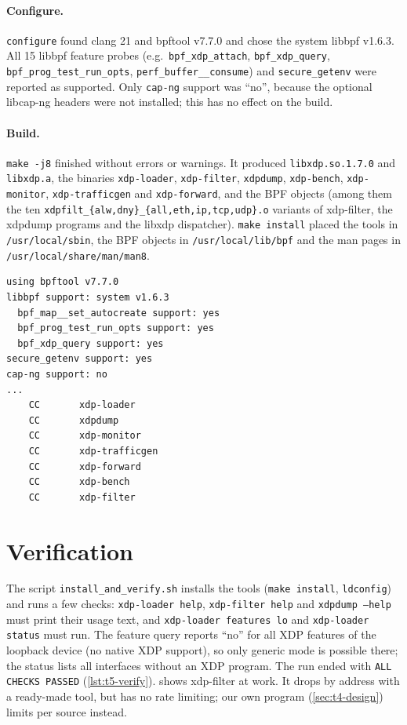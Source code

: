 \paragraph{Configure.} \texttt{configure} found clang 21 and bpftool v7.7.0 and chose the system libbpf v1.6.3. All 15 libbpf feature probes (e.g.\ \texttt{bpf\_xdp\_attach}, \texttt{bpf\_xdp\_query}, \texttt{bpf\_prog\_test\_run\_opts}, \texttt{perf\_buffer\_\_consume}) and \texttt{secure\_getenv} were reported as supported. Only \texttt{cap-ng} support was \enquote{no}, because the optional libcap-ng headers were not installed; this has no effect on the build.

\paragraph{Build.} \texttt{make -j8} finished without errors or warnings. It produced \texttt{libxdp.so.1.7.0} and \texttt{libxdp.a}, the binaries \texttt{xdp-loader}, \texttt{xdp-filter}, \texttt{xdpdump}, \texttt{xdp-bench}, \texttt{xdp-monitor}, \texttt{xdp-trafficgen} and \texttt{xdp-forward}, and the BPF objects (among them the ten \texttt{xdpfilt\_\{alw,dny\}\_\{all,eth,ip,tcp,udp\}.o} variants of xdp-filter, the xdpdump programs and the libxdp dispatcher). \texttt{make install} placed the tools in \texttt{/usr/local/sbin}, the BPF objects in \texttt{/usr/local/lib/bpf} and the man pages in \texttt{/usr/local/share/man/man8}.

\begin{lstlisting}[style=bashsh,float=htbp,caption={Abridged excerpt of \texttt{configure.log} (libbpf and feature probes) and the end of \texttt{make.log} (produced binaries).},label=lst:t5-log]
using bpftool v7.7.0
libbpf support: system v1.6.3
  bpf_map__set_autocreate support: yes
  bpf_prog_test_run_opts support: yes
  bpf_xdp_query support: yes
secure_getenv support: yes
cap-ng support: no
...
    CC       xdp-loader
    CC       xdpdump
    CC       xdp-monitor
    CC       xdp-trafficgen
    CC       xdp-forward
    CC       xdp-bench
    CC       xdp-filter
\end{lstlisting}

\section{Verification}\label{sec:t5-verify}
The script \texttt{install\_and\_verify.sh} installs the tools (\texttt{make install}, \texttt{ldconfig}) and runs a few checks: \texttt{xdp-loader help}, \texttt{xdp-filter help} and \texttt{xdpdump --help} must print their usage text, and \texttt{xdp-loader features lo} and \texttt{xdp-loader status} must run. The feature query reports \enquote{no} for all XDP features of the loopback device (no native XDP support), so only generic mode is possible there; the status lists all interfaces without an XDP program. The run ended with \texttt{ALL CHECKS PASSED} (\cref{lst:t5-verify}).  shows xdp-filter at work. It drops by address with a ready-made tool, but has no rate limiting; our own program (\cref{sec:t4-design}) limits per source instead.

